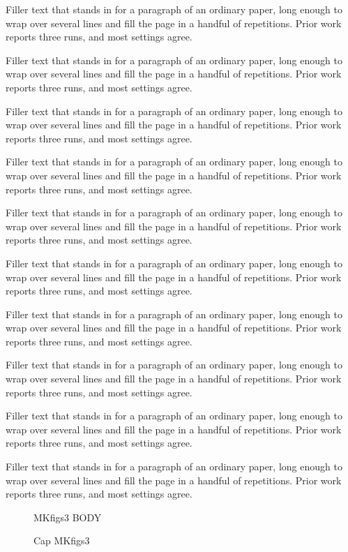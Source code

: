 \documentclass{article}
\begin{document}
Filler text that stands in for a paragraph of an ordinary paper, long enough to wrap over several lines and fill the page in a handful of repetitions. Prior work reports three runs, and most settings agree.\par
Filler text that stands in for a paragraph of an ordinary paper, long enough to wrap over several lines and fill the page in a handful of repetitions. Prior work reports three runs, and most settings agree.\par
Filler text that stands in for a paragraph of an ordinary paper, long enough to wrap over several lines and fill the page in a handful of repetitions. Prior work reports three runs, and most settings agree.\par
Filler text that stands in for a paragraph of an ordinary paper, long enough to wrap over several lines and fill the page in a handful of repetitions. Prior work reports three runs, and most settings agree.\par
Filler text that stands in for a paragraph of an ordinary paper, long enough to wrap over several lines and fill the page in a handful of repetitions. Prior work reports three runs, and most settings agree.\par
Filler text that stands in for a paragraph of an ordinary paper, long enough to wrap over several lines and fill the page in a handful of repetitions. Prior work reports three runs, and most settings agree.\par
Filler text that stands in for a paragraph of an ordinary paper, long enough to wrap over several lines and fill the page in a handful of repetitions. Prior work reports three runs, and most settings agree.\par
Filler text that stands in for a paragraph of an ordinary paper, long enough to wrap over several lines and fill the page in a handful of repetitions. Prior work reports three runs, and most settings agree.\par
Filler text that stands in for a paragraph of an ordinary paper, long enough to wrap over several lines and fill the page in a handful of repetitions. Prior work reports three runs, and most settings agree.\par
Filler text that stands in for a paragraph of an ordinary paper, long enough to wrap over several lines and fill the page in a handful of repetitions. Prior work reports three runs, and most settings agree.\par
\begin{figure}[t]\centering MKfigs3 BODY\caption{Cap MKfigs3}\label{fig:s3}\end{figure}
\end{document}
